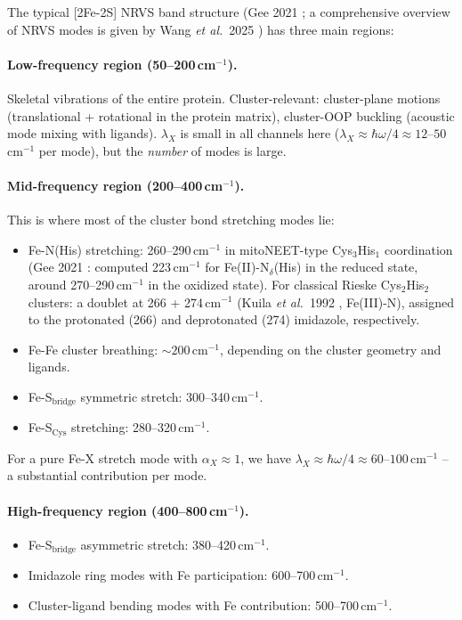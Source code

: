 \documentclass[11pt,a4paper,twoside]{article}
\theoremstyle{remark}
\begin{document}
The typical [2Fe-2S] NRVS band structure (Gee 2021
\cite{Gee2021}; a comprehensive overview of NRVS modes is
given by Wang \emph{et al.}\ 2025 \cite{Wang2025}) has three main
regions:

\paragraph{Low-frequency region (50--200\,cm$^{-1}$).}
Skeletal vibrations of the entire protein. Cluster-relevant:
cluster-plane motions (translational + rotational in the protein
matrix), cluster-OOP buckling (acoustic mode mixing with ligands).
$\lambda_X$ is small in all channels here
($\lambda_X \approx \hbar\omega/4 \approx 12$--$50$\,cm$^{-1}$ per
mode), but the \emph{number} of modes is large.

\paragraph{Mid-frequency region (200--400\,cm$^{-1}$).}
This is where most of the cluster bond stretching modes lie:
\begin{itemize}\setlength{\itemsep}{0pt}
  \item Fe-N(His) stretching:
        260--290\,cm$^{-1}$ in mitoNEET-type Cys$_3$His$_1$
        coordination (Gee 2021 \cite{Gee2021}: computed
        223\,cm$^{-1}$ for Fe(II)-N$_\delta$(His) in the reduced
        state, around 270--290\,cm$^{-1}$ in the oxidized state).
        For classical Rieske Cys$_2$His$_2$ clusters: a doublet at
        266 + 274\,cm$^{-1}$ (Kuila \emph{et al.}\ 1992
        \cite{Kuila1992}, Fe(III)-N), assigned to the protonated
        (266) and deprotonated (274) imidazole, respectively.
  \item Fe-Fe cluster breathing: $\sim 200$\,cm$^{-1}$, depending
        on the cluster geometry and ligands.
  \item Fe-S$_\text{bridge}$ symmetric stretch: 300--340\,cm$^{-1}$.
  \item Fe-S$_\text{Cys}$ stretching: 280--320\,cm$^{-1}$.
\end{itemize}
For a pure Fe-X stretch mode with $\alpha_X \approx 1$, we have
$\lambda_X \approx \hbar\omega/4 \approx 60$--$100$\,cm$^{-1}$ --
a substantial contribution per mode.

\paragraph{High-frequency region (400--800\,cm$^{-1}$).}
\begin{itemize}\setlength{\itemsep}{0pt}
  \item Fe-S$_\text{bridge}$ asymmetric stretch:
        380--420\,cm$^{-1}$.
  \item Imidazole ring modes with Fe participation:
        600--700\,cm$^{-1}$.
  \item Cluster-ligand bending modes with Fe contribution:
        500--700\,cm$^{-1}$.
\end{itemize}
\end{document}
